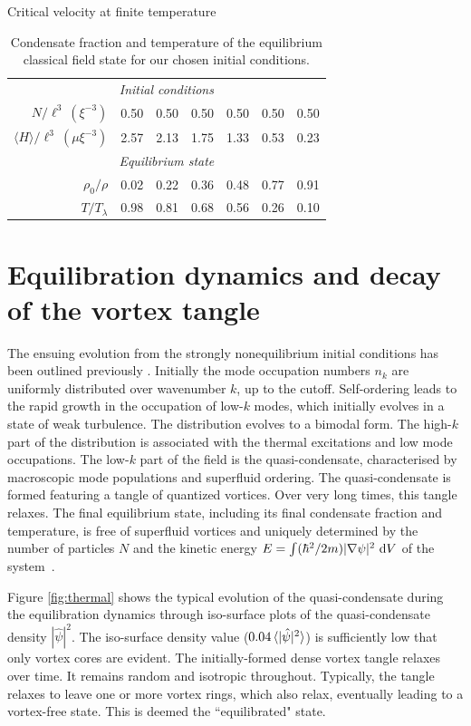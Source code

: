 \begin{chapter}{\label{cha:nonequib}Critical velocity at finite temperature}
\begin{table}
\centering
\begin{tabular}{rcccccc}
\multicolumn{7}{c}{\it Initial conditions} \\
$N/\ell^3~(\xi^{-3})$           & 0.50 & 0.50 & 0.50 & 0.50 & 0.50 & 0.50 \\
$\langle H \rangle/\ell^3~(\mu \xi^{-3})$  & 2.57 & 2.13 & 1.75 & 1.33 & 0.53 & 0.23 \\
\multicolumn{7}{c}{\it Equilibrium state} \\
$\rho_0/\rho$        & 0.02 & 0.22 & 0.36 & 0.48 & 0.77 & 0.91 \\
$T/T_\lambda$        & 0.98 & 0.81 & 0.68 & 0.56 & 0.26 & 0.10
\end{tabular}
\caption{Condensate fraction and temperature of the equilibrium classical field state for our chosen initial conditions.}
\label{tbl:cond_frac}
\end{table}

\section{Equilibration dynamics and decay of the vortex tangle}
\label{sec:tangle}

The ensuing evolution from the strongly nonequilibrium initial conditions has been outlined previously \cite{PhysRevA.66.013603,pattinson_2014}.  Initially the mode occupation numbers $n_k$ are uniformly distributed over wavenumber $k$, up to the cutoff.  Self-ordering leads to the rapid growth in the occupation of low-$k$ modes, which initially evolves in a state of weak turbulence.  The distribution evolves to a bimodal form. The high-$k$ part of the distribution is associated with the thermal excitations and low mode occupations. The low-$k$ part of the field is the quasi-condensate, characterised by macroscopic mode populations and superfluid ordering.  The quasi-condensate is formed featuring a tangle of quantized vortices.  Over very long times, this tangle relaxes.  The final equilibrium state, including its final condensate fraction and temperature, is free of superfluid vortices and uniquely determined by the number of particles $N$ and the kinetic energy $E=\int (\hbar^2/2m)|\nabla \psi|^2~{\rm d}V$ of the system~\cite{PhysRevLett.95.263901}.  

Figure \ref{fig:thermal} shows the typical evolution of the quasi-condensate during the equilibration dynamics through iso-surface plots of the quasi-condensate density $|\hat{\psi}|^2$.  The iso-surface density value ($0.04\braket{|\hat{\psi}|^2}$) is sufficiently low that only vortex cores are evident.   The initially-formed dense vortex tangle relaxes over time.  It remains random and isotropic throughout.  Typically, the tangle relaxes to leave one or more vortex rings, which also relax, eventually leading to a vortex-free state.   This is deemed the ``equilibrated" state.    


\end{chapter}
